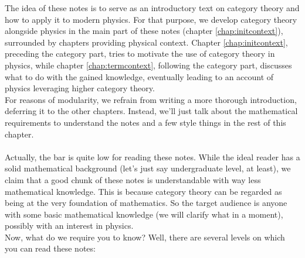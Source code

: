 The idea of these notes is to serve as an introductory text on category theory and how to apply it to modern physics.
For that purpose, we develop category theory alongside physics in the main part of these notes (chapter \ref{chap:initcontext}), surrounded by chapters providing physical context.
Chapter \ref{chap:initcontext}, preceding the category part, tries to motivate the use of category theory in physics, while chapter \ref{chap:termcontext}, following the category part, discusses what to do with the gained knowledge, eventually leading to an account of physics \cite{a565d200} leveraging higher category theory.
\\
For reasons of modularity, we refrain from writing a more thorough introduction, deferring it to the other chapters.
Instead, we'll just talk about the mathematical requirements to understand the notes and a few style things in the rest of this chapter.
\\\\
Actually, the bar is quite low for reading these notes.
While the ideal reader has a solid mathematical background (let's just say undergraduate level, at least), we claim that a good chunk of these notes is understandable with way less mathematical knowledge.
This is because category theory can be regarded as being at the very foundation of mathematics.
So the target audience is anyone with some basic mathematical knowledge (we will clarify {\glqq}what{\grqq} in a moment), possibly with an interest in physics.
\\
Now, what do we require you to know? Well, there are several levels on which you can read these notes:
